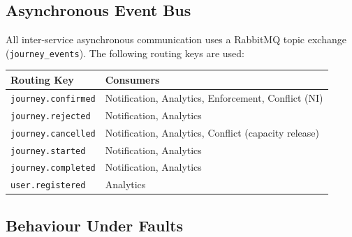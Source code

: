 \documentclass[12pt,a4paper]{article}
\begin{document}
\subsection{Asynchronous Event Bus}

All inter-service asynchronous communication uses a RabbitMQ topic exchange (\texttt{journey\_events}). The following routing keys are used:

\begin{table}[H]
\centering\small
\begin{tabularx}{\textwidth}{l X}
  \toprule
  \textbf{Routing Key} & \textbf{Consumers} \\
  \midrule
  \texttt{journey.confirmed} & Notification, Analytics, Enforcement, Conflict (NI) \\
  \texttt{journey.rejected}  & Notification, Analytics \\
  \texttt{journey.cancelled} & Notification, Analytics, Conflict (capacity release) \\
  \texttt{journey.started}   & Notification, Analytics \\
  \texttt{journey.completed} & Notification, Analytics \\
  \texttt{user.registered}   & Analytics \\
  \bottomrule
\end{tabularx}
\end{table}

\subsection{Behaviour Under Faults}
\end{document}
